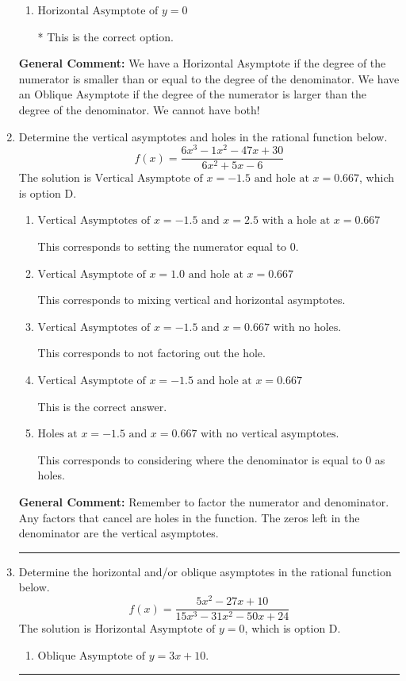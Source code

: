 \documentclass{extbook}[14pt]
\newcommand{\litem}[1]{\item #1

\rule{\textwidth}{0.4pt}}
\begin{document}
\begin{enumerate}
{\begin{enumerate}[label=\Alph*.]
This corresponds to considering where the denominator is equal to 0 as horizontal asymptote.
\item \( \text{Horizontal Asymptote of } y = 0 \)

* This is the correct option.
\end{enumerate}

\textbf{General Comment:} We have a Horizontal Asymptote if the degree of the numerator is smaller than or equal to the degree of the denominator. We have an Oblique Asymptote if the degree of the numerator is larger than the degree of the denominator. We cannot have both!
}
\litem{
Determine the vertical asymptotes and holes in the rational function below.
\[ f(x) = \frac{6x^{3} -1 x^{2} -47 x + 30}{6x^{2} +5 x -6} \]The solution is \( \text{Vertical Asymptote of } x = -1.5 \text{ and hole at } x = 0.667 \), which is option D.\begin{enumerate}[label=\Alph*.]
\item \( \text{Vertical Asymptotes of } x = -1.5 \text{ and } x = 2.5 \text{ with a hole at } x = 0.667 \)

This corresponds to setting the numerator equal to 0.
\item \( \text{Vertical Asymptote of } x = 1.0 \text{ and hole at } x = 0.667 \)

This corresponds to mixing vertical and horizontal asymptotes.
\item \( \text{Vertical Asymptotes of } x = -1.5 \text{ and } x = 0.667 \text{ with no holes.} \)

This corresponds to not factoring out the hole.
\item \( \text{Vertical Asymptote of } x = -1.5 \text{ and hole at } x = 0.667 \)

This is the correct answer.
\item \( \text{Holes at } x = -1.5 \text{ and } x = 0.667 \text{ with no vertical asymptotes.} \)

This corresponds to considering where the denominator is equal to 0 as holes.
\end{enumerate}

\textbf{General Comment:} Remember to factor the numerator and denominator. Any factors that cancel are holes in the function. The zeros left in the denominator are the vertical asymptotes.
}
\litem{
Determine the horizontal and/or oblique asymptotes in the rational function below.
\[ f(x) = \frac{5x^{2} -27 x + 10}{15x^{3} -31 x^{2} -50 x + 24} \]The solution is \( \text{Horizontal Asymptote of } y = 0 \), which is option D.\begin{enumerate}[label=\Alph*.]
\item \( \text{Oblique Asymptote of } y = 3x + 10. \)


\end{enumerate}}
\end{enumerate}
\end{document}
